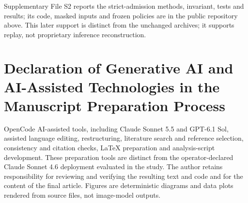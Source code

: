 \documentclass[preprint,12pt,nonatbib]{elsarticle}
\begin{document}
Supplementary File S2 reports the strict-admission methods, invariant, tests and results; its code, masked inputs and frozen policies are in the public repository above. This later support is distinct from the unchanged archives; it supports replay, not proprietary inference reconstruction.

\section*{Declaration of Generative AI and AI-Assisted Technologies in the Manuscript Preparation Process}
OpenCode AI-assisted tools, including Claude Sonnet 5.5 and GPT-6.1 Sol, assisted language editing, restructuring, literature search and reference selection, consistency and citation checks, LaTeX preparation and analysis-script development. These preparation tools are distinct from the operator-declared Claude Sonnet 4.6 deployment evaluated in the study. The author retains responsibility for reviewing and verifying the resulting text and code and for the content of the final article. Figures are deterministic diagrams and data plots rendered from source files, not image-model outputs.

\begingroup
\small
\printbibliography
\endgroup
\end{document}
